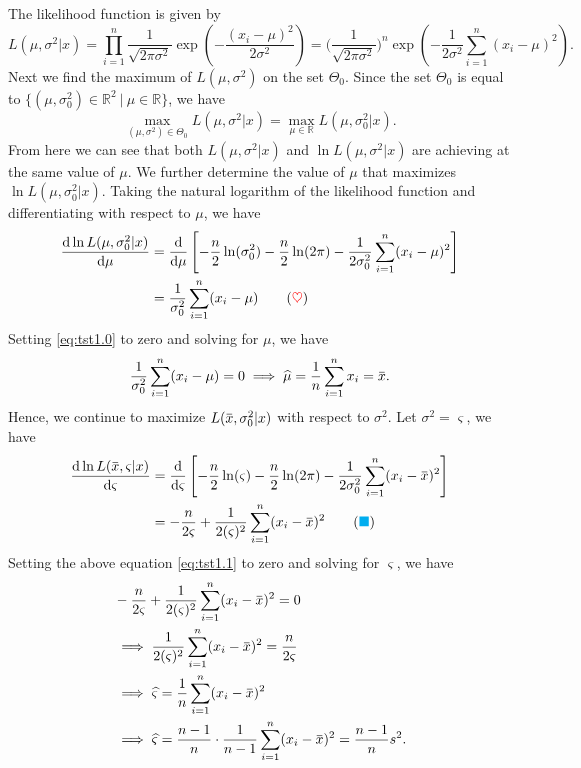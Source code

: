 The likelihood function is given by 
\[
L(\mu, \sigma^2 | x) = \prod_{i=1}^{n} \frac{1}{\sqrt{2\pi \sigma^2}} \exp\left(-\frac{(x_i - \mu)^2}{2\sigma^2}\right)
= \bigg(\frac{1}{\sqrt{2\pi \sigma^2}}\bigg)^n \exp\left(-\frac{1}{2\sigma^2} \sum_{i=1}^{n} (x_i - \mu)^2\right).
\]
Next we find the maximum of $L(\mu, \sigma^2)$ on the set $\Theta_0$. Since the set $\Theta_0$ is equal to 
$\{ (\mu, \sigma^2_0) \in \mathbb{R}^2 \> | \> \mu \in \mathbb{R} \}$, we have 
\[
    \max_{(\mu, \sigma^2) \in \Theta_0} L(\mu, \sigma^2 | x) = \max_{\mu \in \mathbb{R}} L(\mu, \sigma^2_0 | x).
\]
From here we can see that both $L(\mu, \sigma^2 | x)$ and $\ln L(\mu, \sigma^2 | x)$ are achieving at the same value of $\mu$.
We further determine the value of $\mu$ that maximizes $\ln L(\mu, \sigma^2_0 | x)$. Taking 
the natural logarithm of the likelihood function and differentiating with respect to $\mu$, we have
\begin{align*}
    \odv{\ln L(\mu, \sigma^2_0 | x)}{\mu} &= \odv[]{}{\mu} \left[ - \frac{n}{2} \ln (\sigma^2_0) - \frac{n}{2} \ln(2\pi) - \frac{1}{2\sigma^2_0} \sum^n_{i=1} (x_i - \mu)^2 \right]\\
    &= \frac{1}{\sigma^2_0} \sum_{i=1}^{n} (x_i - \mu) \label{eq:tst1.0} \tag{{\color{red} $\heartsuit$}}
\end{align*}
Setting \eqref{eq:tst1.0} to zero and solving for $\mu$, we have
\[
    \frac{1}{\sigma^2_0} \sum_{i=1}^{n} (x_i - \mu) = 0 \implies \widehat{\mu} = \frac{1}{n} \sum_{i=1}^{n} x_i = \ols{x}.
\]
Hence, we continue to maximize $L(\ols{x}, \sigma^2_0 | x)$ with respect to $\sigma^2$. Let $\sigma^2 = \varsigma$, we have
\begin{align*}
    \odv{\ln L(\ols{x}, \varsigma | x)}{\varsigma} &= \odv[]{}{\varsigma} \left[ - \frac{n}{2} \ln (\varsigma) - \frac{n}{2} \ln(2\pi) - \frac{1}{2\sigma^2_0} \sum^n_{i=1} (x_i - \ols{x})^2 \right]\\
    &= -\frac{n}{2\varsigma} + \frac{1}{2(\varsigma)^2} \sum_{i=1}^{n} (x_i - \ols{x})^2 \label{eq:tst1.1} \tag{{\color{cyan} $\blacksquare $}}
\end{align*}
Setting the above equation \eqref{eq:tst1.1} to zero and solving for $\varsigma$, we have
\begin{align*}
    &-\frac{n}{2\varsigma} + \frac{1}{2(\varsigma)^2} \sum_{i=1}^{n} (x_i - \ols{x})^2 = 0\\
    &\implies \frac{1}{2(\varsigma)^2} \sum_{i=1}^{n} (x_i - \ols{x})^2 = \frac{n}{2\varsigma}\\
    &\implies \widehat{\varsigma} = \frac{1}{n} \sum_{i=1}^{n} (x_i - \ols{x})^2 \\
    &\implies \widehat{\varsigma} = \frac{n-1}{n} \cdot \frac{1}{n-1} \sum_{i=1}^{n} (x_i - \ols{x})^2 
    = \frac{n-1}{n} s^2.
\end{align*}
